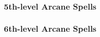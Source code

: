 \subsubsection{5th-level Arcane Spells} 
\begin{swspelllist}

    \SLdelaydamage[Abjur]
    \SLfireshield
    \SLretributivebrilliance
    \SLspelltheft*

    \SLblacktentacles[Conj]
    \SLstinkingcloud
    \SLsummonmonsterv
    \SLwallofstone
    \SLretrievegreater*

    \SLprecognition[Div]
    \SLforesight
    \SLtelepathy
    \SLmanipulateprobability*

    \SLfear[Ench]
    \spellhead{}
    \SLphantasmalmaze
    \SLcharmmonster*

    \SLchainlightning[Evoc]
    \SLconeofcold
    \SLfireshield
    \SLresilientsphere
    \SLtelekineticthrust*

    \SLmirrorimagegreater[Illus]
    \SLphantasmalmaze
    \SLretributivebrilliance
    \spellhead*{}

    \SLinflictlightwounds[Necro]
    \SLwavesoffatigue
    \SLdrainlife*

    \SLdelaydamage[Trans]
    \SLtotemicmindgreater
    \SLtotemicpowergreater
    \SLwallofstone
    \SLreducepersonmass*

    \SLprismaticwall[Univ]
\end{swspelllist}

\subsubsection{6th-level Arcane Spells} 
\begin{swspelllist}

    \SLbanishment[Abjur]
    \SLdispelmagicgreater
    \SLprotectionfromenergygreater
    \SLrepulsion
    \SLprohibition*

    \SLacidarrow[Conj]
    \SLbanishment
    \SLsolidfog
    \SLsummonmonstervi
    \SLetherealjaunt*

    \SLlocateentity[Div]
    \SLtrueseeing
    \SLtruestrike
    \SLmomentofprescience*

    \SLinsanity[Ench]
    \SLpowerwordconfuse
    \SLdiscordantsong
    \SLcharmpersonmass*

    \SLdelayedblastfireball[Evoc]
    \SLgraspinghand
    \SLwallofforce
    \SLtelekinesis*

    \SLmislead[Illus]
    \SLinvisibilitygreater
    \SLpersistentimage*

    \SLcripple[Necro]
    \SLharm
    \SLinflictmoderatewoundsmass

    \SLdisintegrate[Trans]
    \SLtotemicmindmass
    \SLtotemicpowermass
    \SLtransmutefleshandstone
    \SLenlargepersonmass*
    \SLslowmass*

\end{swspelllist}

